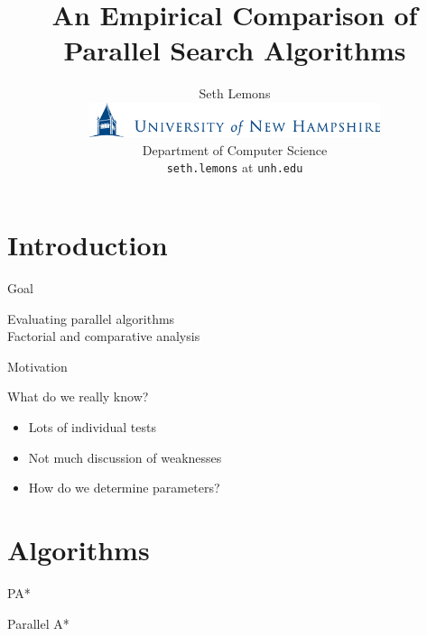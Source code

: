 \documentclass[style=unh]{powerdot}
\title{An Empirical Comparison of Parallel Search Algorithms}
\author{Seth Lemons \vspace{0.2in} \\
  \includegraphics[height=0.4in]{figures/unh-logo-words.eps} \\
  Department of Computer Science \\
  {\tt seth.lemons} at {\tt unh.edu}}
\date{\mbox{}}
\begin{document}
\maketitle


\section[slide=false]{Introduction}


\begin{slide}{Goal}
  \vspace{1in}
  \begin{center}
    Evaluating parallel algorithms \\
    {\tiny Factorial and comparative analysis}
  \end{center}

\end{slide}


\begin{slide}{Motivation}
    \begin{center}
      What do we really know?
    \end{center}

    \begin{itemize}
    \item Lots of individual tests
    \item Not much discussion of weaknesses
    \item How do we determine parameters?
    \end{itemize}
\end{slide}


\section{Algorithms}


\begin{slide}{PA*}
  \vspace{.2in}
  \begin{center}
    Parallel A*
  \end{center}

  \vspace{.1in}

\end{slide}
\end{document}
